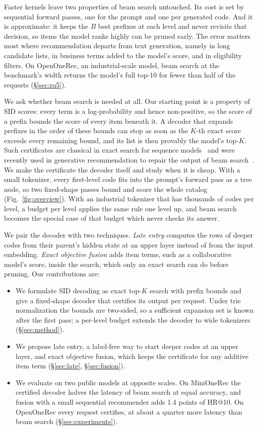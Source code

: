 \documentclass[sigconf,anonymous]{acmart}
\begin{document}
Faster kernels leave two properties of beam search untouched. Its cost is set by sequential forward passes, one for
the prompt and one per generated code. And it is approximate: it keeps the $B$ best prefixes at each level and never
revisits that decision, so items the model ranks highly can be pruned early. The error matters most where
recommendation departs from text generation, namely in long candidate lists, in business terms added to the model's
score, and in eligibility filters. On OpenOneRec, an industrial-scale model, beam search at the benchmark's width
returns the model's full top-10 for fewer than half of the requests (\S\ref{sec:rq5}).

We ask whether beam search is needed at all. Our starting point is a property of SID scores: every term is a
log-probability and hence non-positive, so the score of a prefix bounds the score of every item beneath it. A
decoder that expands prefixes in the order of these bounds can stop as soon as the $K$-th exact score exceeds every
remaining bound, and its list is then provably the model's top-$K$. Such certificates are classical in exact
search for sequence models~\cite{stahlberg2019,stahlberg2022,fagin2003} and were recently used in generative
recommendation to repair the output of beam search~\cite{ax2609.33745}. We make the certificate the decoder itself
and study when it is cheap. With a small tokenizer, every first-level code fits into the prompt's forward pass as a
tree node, so two fixed-shape passes bound and score the whole catalog (Fig.~\ref{fig:overview}). With an
industrial tokenizer that has thousands of codes per level, a budget per level applies the same rule one level up,
and beam search becomes the special case of that budget which never checks its answer.

We pair the decoder with two techniques. \emph{Late entry} computes the rows of deeper codes from their parent's
hidden state at an upper layer instead of from the input embedding. \emph{Exact objective fusion} adds item terms,
such as a collaborative model's score, inside the search, which only an exact search can do before pruning. Our
contributions are:
\begin{itemize}
\item We formulate SID decoding as exact top-$K$ search with prefix bounds and give a fixed-shape decoder that
  certifies its output per request. Under trie normalization the bounds are two-sided, so a sufficient expansion
  set is known after the first pass; a per-level budget extends the decoder to wide tokenizers
  (\S\ref{sec:method}).
\item We propose late entry, a label-free way to start deeper codes at an upper layer, and exact objective fusion,
  which keeps the certificate for any additive item term (\S\ref{sec:late}, \S\ref{sec:fusion}).
\item We evaluate on two public models at opposite scales. On MiniOneRec the certified decoder halves the latency
  of beam search at equal accuracy, and fusion with a small sequential recommender adds 1.4 points of HR@10. On
  OpenOneRec every request certifies, at about a quarter more latency than beam search (\S\ref{sec:experiments}).
\end{itemize}
\end{document}
